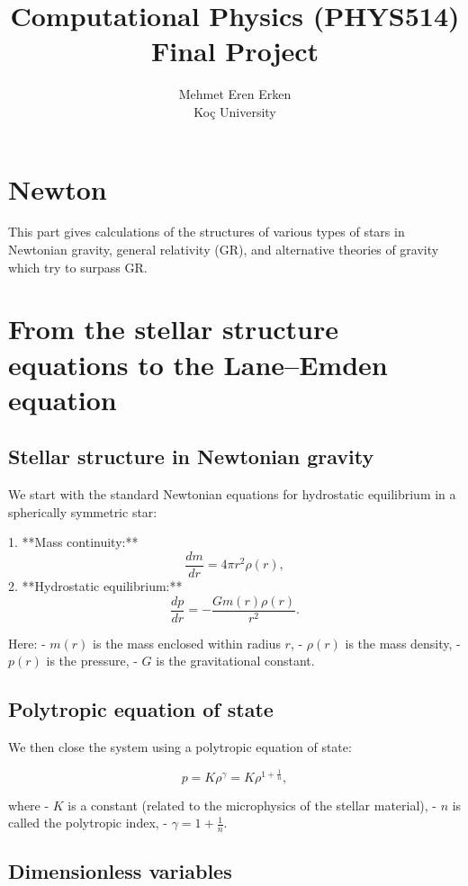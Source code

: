 \documentclass{article}
\title{Computational Physics (PHYS514) Final Project}
\author{Mehmet Eren Erken \\
Koç University}
\date{}
\begin{document}
\maketitle

\section*{Newton}

This part gives calculations of the structures of various types of stars in Newtonian gravity, general relativity (GR), and alternative theories of gravity which try to surpass GR.

\section{From the stellar structure equations to the Lane–Emden equation}

\subsection{Stellar structure in Newtonian gravity}

We start with the standard Newtonian equations for hydrostatic equilibrium in a spherically symmetric star:

1. **Mass continuity:**
   \[
   \frac{dm}{dr} = 4\pi r^2 \rho(r),
   \]
2. **Hydrostatic equilibrium:**
   \[
   \frac{dp}{dr} = -\frac{G m(r) \rho(r)}{r^2}.
   \]

Here:
- \(m(r)\) is the mass enclosed within radius \(r\),
- \(\rho(r)\) is the mass density,
- \(p(r)\) is the pressure,
- \(G\) is the gravitational constant.

\subsection{Polytropic equation of state}

We then close the system using a polytropic equation of state:

\[
p = K \rho^\gamma = K \rho^{1 + \tfrac{1}{n}},
\]

where
- \(K\) is a constant (related to the microphysics of the stellar material),
- \(n\) is called the polytropic index,
- \(\gamma = 1 + \frac{1}{n}\).

\subsection{Dimensionless variables}
\end{document}
